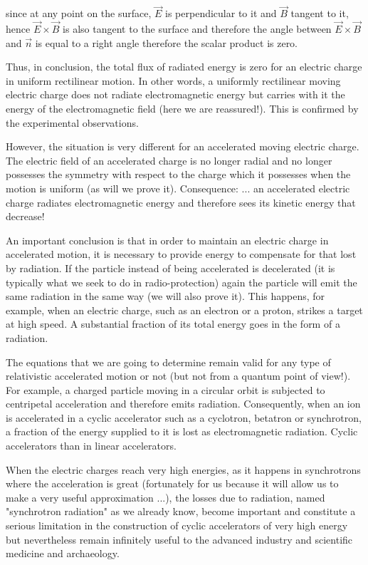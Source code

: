 	since at any point on the surface, $\vec{E}$ is perpendicular to it and $\vec{B}$ tangent to it, hence $\vec{E}\times\vec{B}$ is also tangent to the surface and therefore the angle between $\vec{E}\times\vec{B}$ and $\vec{n}$ is equal to a right angle therefore the scalar product is zero.

	Thus, in conclusion, the total flux of radiated energy is zero for an electric charge in uniform rectilinear motion. In other words, a uniformly rectilinear moving electric charge does not radiate electromagnetic energy but carries with it the energy of the electromagnetic field (here we are reassured!). This is confirmed by the experimental observations.

	However, the situation is very different for an accelerated moving electric charge. The electric field of an accelerated charge is no longer radial and no longer possesses the symmetry with respect to the charge which it possesses when the motion is uniform (as will we prove it). Consequence: ... an accelerated electric charge radiates electromagnetic energy and therefore sees its kinetic energy that decrease!

	An important conclusion is that in order to maintain an electric charge in accelerated motion, it is necessary to provide energy to compensate for that lost by radiation. If the particle instead of being accelerated is decelerated (it is typically what we seek to do in radio-protection) again the particle will emit the same radiation in the same way (we will also prove it). This happens, for example, when an electric charge, such as an electron or a proton, strikes a target at high speed. A substantial fraction of its total energy goes in the form of a radiation.

	The equations that we are going to determine remain valid for any type of relativistic accelerated motion or not (but not from a quantum point of view!). For example, a charged particle moving in a circular orbit is subjected to centripetal acceleration and therefore emits radiation. Consequently, when an ion is accelerated in a cyclic accelerator such as a cyclotron, betatron or synchrotron, a fraction of the energy supplied to it is lost as electromagnetic radiation. Cyclic accelerators than in linear accelerators.
	
	When the electric charges reach very high energies, as it happens in synchrotrons where the acceleration is great (fortunately for us because it will allow us to make a very useful approximation ...), the losses due to radiation, named "synchrotron radiation" as we already know, become important and constitute a serious limitation in the construction of cyclic accelerators of very high energy but nevertheless remain infinitely useful to the advanced industry and scientific medicine and archaeology.


